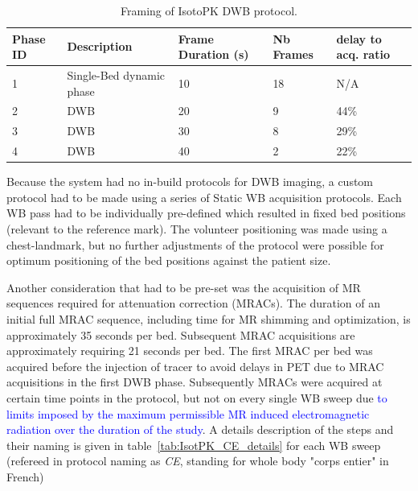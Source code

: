 \begin{table}[]
\caption{Framing of IsotoPK DWB protocol.}
\label{tab:IsotoPK_Framing}
\begin{tabular}{|l|l|l|l|l|}
\toprule
\textbf{Phase ID} & \textbf{Description}              & \textbf{Frame Duration (s)} & \textbf{Nb Frames} & \textbf{delay to acq. ratio} \\
\midrule
1        & Single-Bed dynamic phase & 10                 & 18        & N/A                 \\
2        & DWB                      & 20                 & 9         & 44\%                \\
3        & DWB                      & 30                 & 8         & 29\%                \\
4        & DWB                      & 40                 & 2         & 22\%                \\
\bottomrule
\end{tabular}
\end{table}

Because the system had no in-build protocols for DWB imaging, a custom protocol had to be made using a series of Static WB acquisition protocols.
Each WB pass had to be individually pre-defined which resulted in fixed bed positions (relevant to the reference mark). The volunteer positioning was made using a chest-landmark, but no further adjustments of the protocol were possible for optimum positioning of the bed positions against the patient size. 

Another consideration that had to be pre-set was the acquisition of MR sequences required for attenuation correction (MRACs). The duration of an initial full MRAC sequence, including time for MR shimming and optimization, is approximately 35 seconds per bed. Subsequent MRAC acquisitions are approximately requiring 21 seconds per bed. The first MRAC per bed was acquired before the injection of tracer to avoid delays in PET due to MRAC acquisitions in the first DWB phase. Subsequently MRACs were acquired at certain time points in the protocol, but not on every single WB sweep due \textcolor{blue}{to limits imposed by the maximum permissible MR induced electromagnetic radiation over the duration of the study}. A details description of the steps and their naming is given in table~\ref{tab:IsotPK_CE_details} for each WB sweep (refereed in protocol naming as \textit{CE}, standing for whole body "corps entier" in French)

